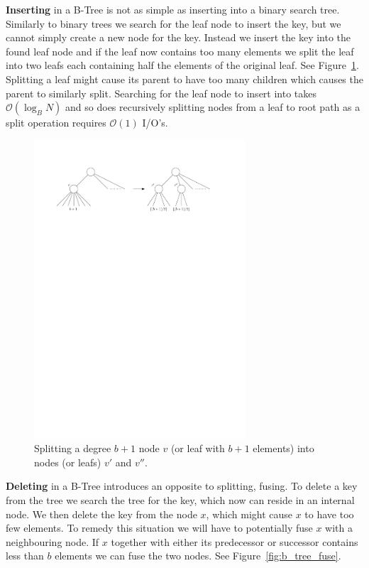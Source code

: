 \documentclass[twoside,11pt,openright]{report}
\begin{document}
\textbf{Inserting} in a B-Tree is not as simple as inserting into a binary search tree. Similarly to binary trees we search for the leaf node to insert the key, but we cannot simply create a new node for the key. Instead we insert the key into the found leaf node and if the leaf now contains too many elements we split the leaf into two leafs each containing half the elements of the original leaf. See Figure~\ref{fig:b_tree_split}. Splitting a leaf might cause its parent to have too many children which causes the parent to similarly split.
Searching for the leaf node to insert into takes $\mathcal{O}(\log_B N)$ and so does recursively splitting nodes from a leaf to root path as a split operation requires $\mathcal{O}(1)$ I/O's.

\begin{figure}[H]
	\centering
	\includegraphics[width=0.7\textwidth]{../figures/b_tree_split}
	\caption{Splitting a degree $b+1$ node $v$ (or leaf with $b+1$ elements) into nodes (or leafs) $v'$ and $v''$.}
	\label{fig:b_tree_split}
\end{figure}

\textbf{Deleting} in a B-Tree introduces an opposite to splitting, fusing. To delete a key from the tree we search the tree for the key, which now can reside in an internal node. We then delete the key from the node $x$, which might cause $x$ to have too few elements. To remedy this situation we will have to potentially fuse $x$ with a neighbouring node. If $x$ together with either its predecessor or successor contains less than $b$ elements we can fuse the two nodes. See Figure~\ref{fig:b_tree_fuse}.
\end{document}
